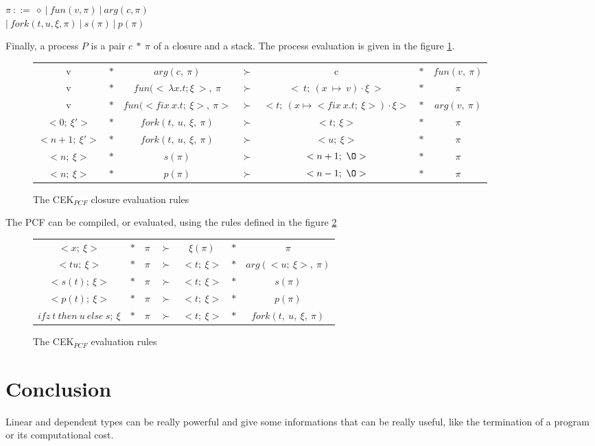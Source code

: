 \documentclass[a4paper,12pt]{article}
\begin{document}
\begin{center}
  $\pi~::=~\diamond~|~fun(v, \pi)~|~arg(c, \pi)$ \\
  $|~fork(t,u,\xi,\pi)~|~s(\pi)~|~p(\pi)$
\end{center}

Finally, a process $P$ is a pair $c~*~\pi$ of a closure and a stack. The process
evaluation is given in the figure \ref{cek-eval-closure}.

\begin{figure}[!ht]
  \begin{center}
    \begin{tabular}{|c c c c c c c|}
      \hline
      v & $*$ & $arg(c,~\pi)$ & $\succ$ & c & $*$ & $fun(v,~\pi)$ \\
      v & $*$ & $fun(<~\lambda x.t;\xi~>,~\pi$ & $\succ$ &
      $<~t;~(x~\mapsto~v)\cdot \xi~>$ 
      & $*$ & $\pi$ \\
      v & $*$ & $fun(<fix~x.t;~\xi>,~\pi>$ & $\succ$ &
      $<t;~(x\mapsto <fix~x.t;~\xi>) \cdot \xi>$ & $*$ & $arg(v,~\pi)$ \\
      $<0;~\xi'>$ & $*$ & $fork(t,~u,~\xi,~\pi)$ & $\succ$ &
      $<t;~\xi>$ & $*$ & $\pi$ \\
      $<n+1;~\xi'>$ & $*$ & $fork(t,~u,~\xi,~\pi)$ & $\succ$ &
      $<u;~\xi>$ & $*$ & $\pi$ \\
      $<n;~\xi>$ & $*$ & $s(\pi)$ & $\succ$ &
      $<n+1;~\O>$ & $*$ & $\pi$ \\
      $<n;~\xi>$ & $*$ & $p(\pi)$ & $\succ$ &
      $<n-1;~\O>$ & $*$ & $\pi$ \\
      \hline
    \end{tabular}
  \end{center}
  \caption{The CEK$_{PCF}$ closure evaluation rules}
  \label{cek-eval-closure}
\end{figure}


The PCF can be compiled, or evaluated, using the rules defined in the figure \ref{cek-eval-rules}

\begin{figure}[!ht]
  \begin{center}
    \begin{tabular}{|c c c c c c c|}
      \hline
      $<x;~\xi>$ & $*$ & $\pi$ & $\succ$ & $\xi(\pi)$ & $*$ & $\pi$ \\
      $<tu;~\xi>$ & $*$ & $\pi$ & $\succ$ & $<t;~\xi>$ & $*$ & 
      $arg(<u;~\xi>,~\pi)$ \\
      $<s(t);~\xi>$ & $*$ & $\pi$ & $\succ$ & $<t;~\xi>$ & $*$ & 
      $s(\pi)$ \\
      $<p(t);~\xi>$ & $*$ & $\pi$ & $\succ$ & $<t;~\xi>$ & $*$ & 
      $p(\pi)$ \\
      $ifz~t~then~u~else~s;~\xi$ 
      & $*$ & $\pi$ & $\succ$ & $<t;~\xi>$ & $*$ & 
      $fork(t,~u,~\xi,~\pi)$ \\
      \hline
    \end{tabular}
  \end{center}
  \caption{The CEK$_{PCF}$ evaluation rules}
  \label{cek-eval-rules}
\end{figure}

\section{Conclusion}

Linear and dependent types can be really powerful and give some informations
that can be really useful, like the termination of a program or its
computational cost.




\end{document}
